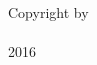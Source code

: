 \newcommand{\theyear}{2016}

\clearpage
\thispagestyle{empty}
\centering
\vspace*{-\toptafiddle}

\vfill

Copyright by \\
\theauthor{} \\
\theyear{}

\enlargethispage{\bottafiddle}
\clearpage
